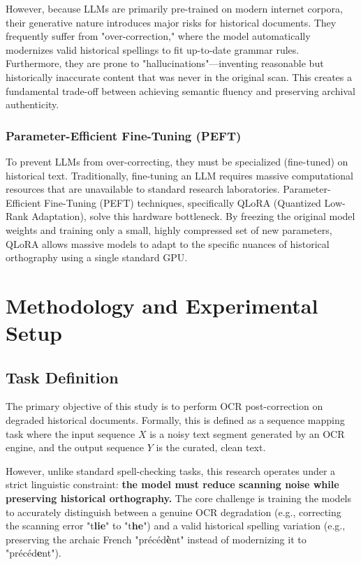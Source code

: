\documentclass[11pt]{extarticle}
\begin{document}
However, because LLMs are primarily pre-trained on modern internet corpora, their generative nature introduces major risks for historical documents. They frequently suffer from "over-correction," where the model automatically modernizes valid historical spellings to fit up-to-date grammar rules. Furthermore, they are prone to "hallucinations"—inventing 
reasonable but historically inaccurate content that was never in the original scan. This creates a fundamental trade-off between achieving semantic fluency and preserving archival authenticity.

\subsubsection{Parameter-Efficient Fine-Tuning (PEFT)}
To prevent LLMs from over-correcting, they must be specialized (fine-tuned) on historical text. Traditionally, fine-tuning an LLM requires massive computational resources that are unavailable to standard research laboratories. Parameter-Efficient Fine-Tuning (PEFT) techniques, specifically QLoRA (Quantized Low-Rank Adaptation)\cite{dettmers2023qloraefficientfinetuningquantized}, solve this hardware bottleneck. By freezing the original model weights and training only a small, highly compressed set of new parameters, QLoRA allows massive models to adapt to the specific nuances of historical orthography using a single standard GPU.

\section{Methodology and Experimental Setup}

\subsection{Task Definition}
The primary objective of this study is to perform OCR post-correction on degraded historical documents. Formally, this is defined as a sequence mapping task where the input sequence $X$ is a noisy text segment generated by an OCR engine, and the output sequence $Y$ is the curated, clean text. 

However, unlike standard spell-checking tasks, this research operates under a strict linguistic constraint: \textbf{the model must reduce scanning noise while preserving historical orthography.} The core challenge is training the models to accurately distinguish between a genuine OCR degradation (e.g., correcting the scanning error "t\textbf{lie}" to "t\textbf{he}") and a valid historical spelling variation (e.g., preserving the archaic French "précéd\textbf{è}nt" instead of modernizing it to "précéd\textbf{e}nt").
\end{document}
